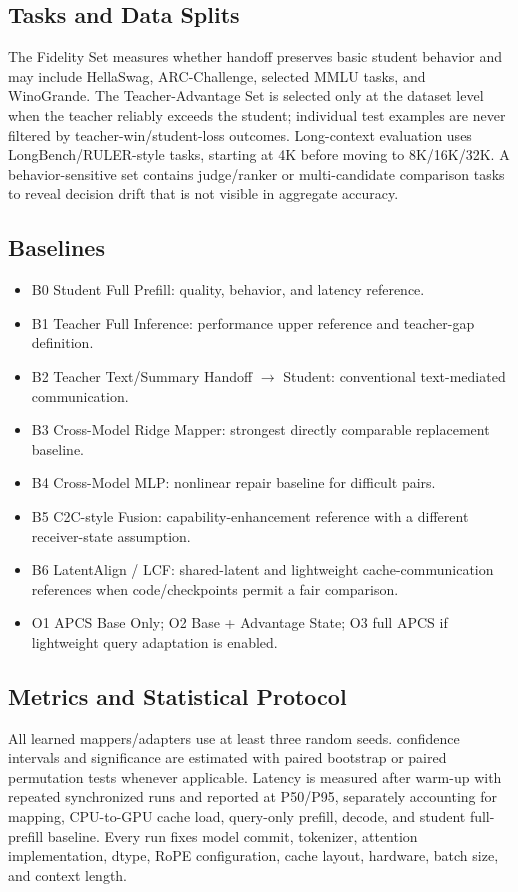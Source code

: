 \documentclass[10pt]{article}
\newcommand{\method}{APCS}
\newcommand{\chg}{\text{CHG}}
\begin{document}
\subsection{Tasks and Data Splits}
The Fidelity Set measures whether handoff preserves basic student behavior and may include
HellaSwag, ARC-Challenge, selected MMLU tasks, and WinoGrande. The Teacher-Advantage Set is
selected only at the dataset level when the teacher reliably exceeds the student; individual test
examples are never filtered by teacher-win/student-loss outcomes. Long-context evaluation uses
LongBench/RULER-style tasks, starting at 4K before moving to 8K/16K/32K. A behavior-sensitive set
contains judge/ranker or multi-candidate comparison tasks to reveal decision drift that is not
visible in aggregate accuracy.

\subsection{Baselines}
\begin{itemize}[leftmargin=*,nosep]
  \item B0 Student Full Prefill: quality, behavior, and latency reference.
  \item B1 Teacher Full Inference: performance upper reference and teacher-gap definition.
  \item B2 Teacher Text/Summary Handoff $\rightarrow$ Student: conventional text-mediated communication.
  \item B3 Cross-Model Ridge Mapper: strongest directly comparable replacement baseline.
  \item B4 Cross-Model MLP: nonlinear repair baseline for difficult pairs.
  \item B5 C2C-style Fusion: capability-enhancement reference with a different receiver-state assumption.
  \item B6 LatentAlign / LCF: shared-latent and lightweight cache-communication references when code/checkpoints permit a fair comparison.
  \item O1 \method{} Base Only; O2 Base + Advantage State; O3 full \method{} if lightweight query adaptation is enabled.
\end{itemize}

\subsection{Metrics and Statistical Protocol}
All learned mappers/adapters use at least three random seeds. \chg{} confidence intervals and
significance are estimated with paired bootstrap or paired permutation tests whenever applicable.
Latency is measured after warm-up with repeated synchronized runs and reported at P50/P95,
separately accounting for mapping, CPU-to-GPU cache load, query-only prefill, decode, and student
full-prefill baseline. Every run fixes model commit, tokenizer, attention implementation, dtype,
RoPE configuration, cache layout, hardware, batch size, and context length.
\end{document}
